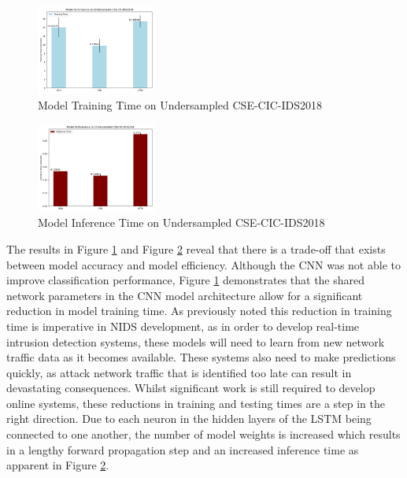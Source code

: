 \documentclass[conference]{IEEEtran}
\begin{document}
\begin{figure}[htpb]
  \centering
  \includegraphics[width=0.35\textwidth]{images/train_time_cic.pdf}
  \caption{Model Training Time on Undersampled CSE-CIC-IDS2018}
  \label{fig:train_time_cic}
\end{figure}

\begin{figure}[htpb]
  \centering
  \includegraphics[width=0.35\textwidth]{images/test_time_cic.pdf}
  \caption{Model Inference Time on Undersampled CSE-CIC-IDS2018}
  \label{fig:test_time_cic}
\end{figure}


The results in Figure \ref{fig:train_time_cic} and Figure \ref{fig:test_time_cic} reveal that there is a trade-off that exists between model accuracy and model efficiency. Although the CNN was not able to improve classification performance, Figure \ref{fig:train_time_cic} demonstrates that the shared network parameters in the CNN model architecture allow for a significant reduction in model training time. As previously noted this reduction in training time is imperative in NIDS development, as in order to develop real-time intrusion detection systems, these models will need to learn from new network traffic data as it becomes available.  These systems also need to make predictions quickly, as attack network traffic that is identified too late can result in devastating consequences.  Whilst significant work is still required to develop online systems, these reductions in training and testing times are a step in the right direction. 
Due to each neuron in the hidden layers of the LSTM being connected to one another, the number of model weights is increased which results in a lengthy forward propagation step and an increased inference time as apparent in Figure \ref{fig:test_time_cic}.
\end{document}
